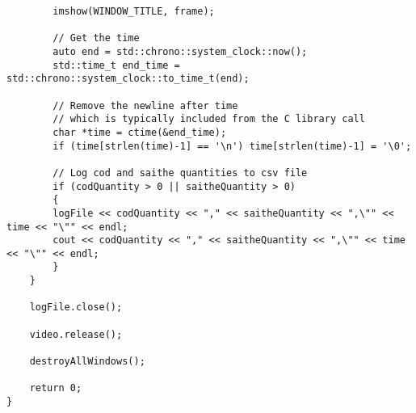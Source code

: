\begin{verbatim}
        imshow(WINDOW_TITLE, frame);

        // Get the time
        auto end = std::chrono::system_clock::now();
        std::time_t end_time = std::chrono::system_clock::to_time_t(end);

        // Remove the newline after time
        // which is typically included from the C library call
        char *time = ctime(&end_time);
        if (time[strlen(time)-1] == '\n') time[strlen(time)-1] = '\0';

        // Log cod and saithe quantities to csv file
        if (codQuantity > 0 || saitheQuantity > 0)
        {
        logFile << codQuantity << "," << saitheQuantity << ",\"" << time << "\"" << endl;
        cout << codQuantity << "," << saitheQuantity << ",\"" << time << "\"" << endl;
        }
    }

    logFile.close();

    video.release();

    destroyAllWindows();

    return 0;
}
\end{verbatim}
